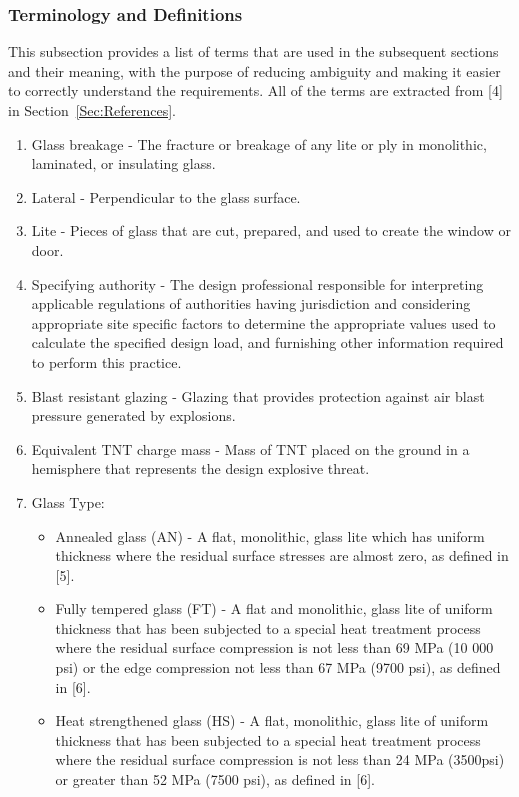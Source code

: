 \documentclass[12pt]{article}
\begin{document}
\subsubsection{Terminology and Definitions}
\label{Sec:TermDefs}
This subsection provides a list of terms that are used in the subsequent sections and their meaning, with the purpose of reducing ambiguity and making it easier to correctly understand the requirements. All of the terms are extracted from {[}4{]} in Section~\ref{Sec:References}.
\begin{enumerate}
\item{Glass breakage - The fracture or breakage of any lite or ply in monolithic, laminated, or insulating glass.}
\item{Lateral - Perpendicular to the glass surface.}
\item{Lite - Pieces of glass that are cut, prepared, and used to create the window or door.}
\item{Specifying authority - The design professional responsible for interpreting applicable regulations of authorities having jurisdiction and considering appropriate site specific factors to determine the appropriate values used to calculate the specified design load, and furnishing other information required to perform this practice.}
\item{Blast resistant glazing - Glazing that provides protection against air blast pressure generated by explosions.}
\item{Equivalent TNT charge mass - Mass of TNT placed on the ground in a hemisphere that represents the design explosive threat.}
\item{Glass Type:}
\begin{itemize}
\item{Annealed glass (AN) - A flat, monolithic, glass lite which has uniform thickness where the residual surface stresses are almost zero, as defined in [5].}
\item{Fully tempered glass (FT) - A flat and monolithic, glass lite of uniform thickness that has been subjected to a special heat treatment process where the residual surface compression is not less than 69 MPa (10 000 psi) or the edge compression not less than 67 MPa (9700 psi), as defined in [6].}
\item{Heat strengthened glass (HS) - A flat, monolithic, glass lite of uniform thickness that has been subjected to a special heat treatment process where the residual surface compression is not less than 24 MPa (3500psi) or greater than 52 MPa (7500 psi), as defined in [6].}

\end{itemize}
\end{enumerate}
\end{document}
